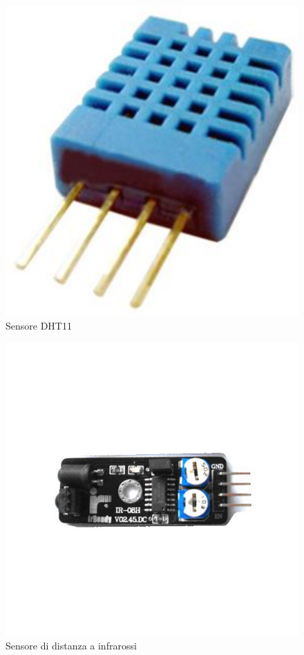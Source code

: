 \documentclass[a4paper,titlepage]{book}
\begin{document}
\begin{figure}[!h]
\centering
\includegraphics[scale=0.5]{DHT11.png}
\caption{Sensore DHT11}
\end{figure}


\begin{figure}[!h]
\centering
\includegraphics[scale=0.5]{dist1.jpg}
\caption{Sensore di distanza a infrarossi}
\end{figure}
\end{document}
